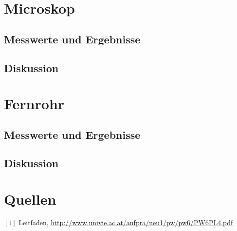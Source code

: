 \documentclass[12pt,a4paper]{article}
\begin{document}
\begin{multicols}{2}
\section{Microskop}

\subsection{Messwerte und Ergebnisse}

\subsection{Diskussion}

\section{Fernrohr}

\subsection{Messwerte und Ergebnisse}

\subsection{Diskussion}

\section{Quellen}
$[1]$ Leitfaden, \url{http://www.univie.ac.at/anfpra/neu1/pw/pw6/PW6PL4.pdf}\\

\end{multicols}
\end{document}
